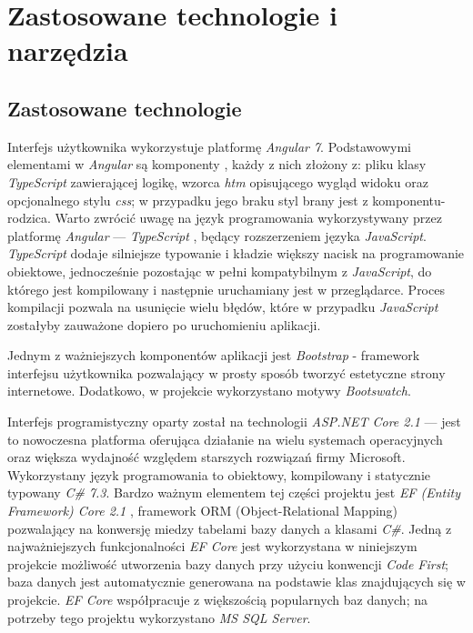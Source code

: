 \documentclass[eng,printmode,openany]{mgr}
\begin{document}
	\chapter{Zastosowane technologie i narzędzia}
	\section{Zastosowane technologie}
	Interfejs użytkownika wykorzystuje platformę \textit{Angular 7}. Podstawowymi elementami w \textit{Angular} są komponenty \cite{angular-components}, każdy z nich złożony z: pliku klasy \textit{TypeScript} zawierającej logikę, wzorca \textit{htm} opisującego wygląd widoku oraz opcjonalnego stylu \textit{css}; w przypadku jego braku styl brany jest z komponentu-rodzica. Warto zwrócić uwagę na język programowania wykorzystywany przez platformę \textit{Angular} — \textit{TypeScript} \cite{msdn-ts}, będący rozszerzeniem języka \textit{JavaScript}. \textit{TypeScript} dodaje silniejsze typowanie i kładzie większy nacisk na programowanie obiektowe, jednocześnie pozostając w pełni kompatybilnym z \textit{JavaScript}, do którego jest kompilowany i  następnie uruchamiany jest w przeglądarce. Proces kompilacji pozwala na usunięcie wielu błędów, które w przypadku \textit{JavaScript} zostałyby zauważone dopiero po uruchomieniu aplikacji.
	
	Jednym z ważniejszych komponentów aplikacji jest \textit{Bootstrap} - framework interfejsu użytkownika pozwalający w prosty sposób tworzyć estetyczne strony internetowe. Dodatkowo, w projekcie wykorzystano motywy \textit{Bootswatch}.
	
	Interfejs programistyczny oparty został na technologii \textit{ASP.NET Core 2.1} — jest to nowoczesna platforma oferująca działanie na wielu systemach operacyjnych oraz większa wydajność względem starszych rozwiązań firmy Microsoft. Wykorzystany język programowania to obiektowy, kompilowany i statycznie typowany \textit{C\# 7.3}. Bardzo ważnym elementem tej części projektu jest \textit{EF (Entity Framework) Core 2.1} \cite{msdn-efcore}, framework ORM (Object-Relational Mapping) pozwalający na konwersję miedzy tabelami bazy danych a klasami \textit{C\#}. Jedną z najważniejszych funkcjonalności \textit{EF Core} jest wykorzystana w niniejszym projekcie możliwość utworzenia bazy danych przy użyciu konwencji \textit{Code First}; baza danych jest automatycznie generowana na podstawie klas  znajdujących się w projekcie. \textit{EF Core} współpracuje z większością popularnych baz danych; na potrzeby tego projektu wykorzystano \textit{MS SQL Server}.
	
\end{document}
